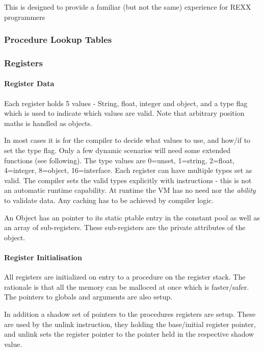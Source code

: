 This is designed to provide a familiar (but not the same) experience for REXX programmers

\subsubsection{Procedure Lookup Tables}

\subsubsection{Registers}

\paragraph{Register Data}

Each register holds 5 values - String, float, integer and object, and a type flag which is used to indicate which values are valid. Note that arbitrary position maths is handled as objects.

In most cases it is for the compiler to decide what values to use, and how/if to set the type flag. Only a few dynamic scenarios will need some extended functions (see following). The type values are 0=unset, 1=string, 2=float, 4=integer, 8=object, 16=interface. Each register can have multiple types set as valid. The compiler sets the valid types explicitly with instructions - this is not an automatic runtime capability. At runtime the VM has no need nor the \emph{ability} to validate data. Any caching has to be achieved by compiler logic.

An Object has an pointer to its static ptable entry in the constant pool as well as an array of sub-registers. These sub-registers are the private attributes of the object.

\paragraph{Register Initialisation}

All registers are initialized on entry to a procedure on the register \textquotedbl{}stack\textquotedbl{}. The rationale is that all the memory can be malloced at once which is faster/safer. The pointers to globals and arguments are also setup.

In addition a shadow set of pointers to the procedure\textquotesingle{}s registers are setup. These are used by the unlink instruction, they holding the base/initial register pointer, and unlink sets the register pointer to the pointer held in the respective shadow value.

